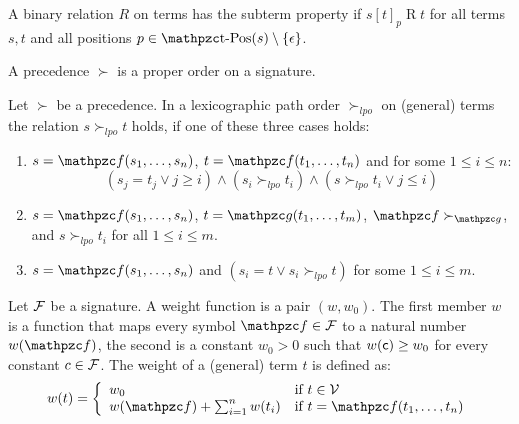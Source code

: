 
\begin{definition}
	A binary relation $R$ on terms has the {\myem subterm property} if 
	$s[t]_p\mathbin{R}t$ for all terms $s,t$ and all positions $p\in\pos(s) \setminus \{\epsilon\}$.
\end{definition}

\begin{definition}\label{def:prec}
	A {\myem precedence} $\succ$ is a proper order 
	on a signature.
\end{definition}

\begin{definition}[LPO]\label{def:lpo}
	Let $\succ$ be a precedence. In a {\myem lexicographic path order} $\succ_{lpo}$ on (general) terms the relation $s\succ_{lpo} t$ holds,
	if one of these three cases holds:
	\begin{enumerate}
		\item $s=\mcf(s_1,\ldots,s_n)$, $t=\mcf(t_1,\ldots,t_n)$ and for some $1\leq i\leq n$:
		\[
		(s_j=t_j\lor j\geq i) \land (s_i\succ_{lpo} t_i) \land (s\succ_{lpo} t_i \lor j\leq i)
		\]
		\item $s=\mcf(s_1,\ldots,s_n)$, $t=\mcg(t_1,\ldots,t_m)$, $\mcf\succ_\mcg$, and $s\succ_{lpo} t_i$ for all $1\leq i\leq m$.
		\item $s=\mcf(s_1,\ldots,s_n)$ and $(s_i=t \lor s_i\succ_{lpo} t)$ for some $1\leq i\leq m$.
	\end{enumerate}
\end{definition}

\begin{definition}\label{def:weight}
	Let ${\mathcal F}$ be a signature.
	A {\myem weight function} is a pair $(w,w_0)$. 
	The first member $w$ is a function that maps every symbol $\mcf\in\mcF$ to a natural number $w(\mcf)$,
	the second is a constant $w_0>0$ such that $w({\mathsf c})\geq w_0$ for every constant $c\in{\mathcal F}$. 
	The weight of a (general) term $t$ is defined as:
	\begin{gather*}
	w(t) = \left\{ \begin{array}{ll} 
	w_0 & \text{if } t\in\mcV\\
	w(\mcf)+\sum_{i=1}^n w(t_i) & \text{if }t=\mcf(t_1,\ldots,t_n)
	\end{array}\right.
	\end{gather*}
\end{definition}

